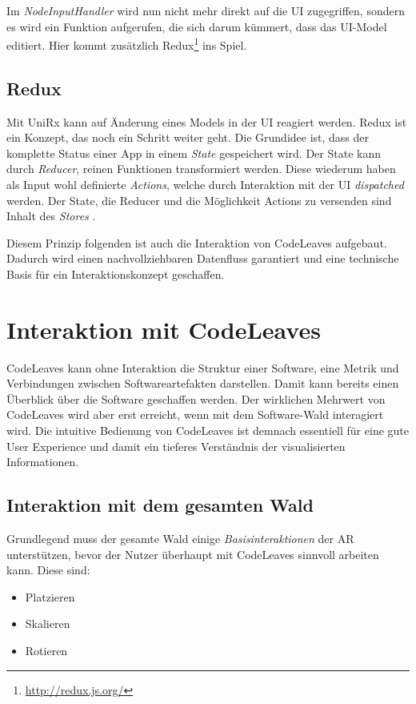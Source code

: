 Im \textit{NodeInputHandler} wird nun nicht mehr direkt auf die UI zugegriffen, sondern es wird ein Funktion aufgerufen, die sich darum kümmert, dass das UI-Model editiert. Hier kommt zusätzlich Redux\footnote{\url{http://redux.js.org/}} ins Spiel.

\subsection{Redux}
Mit UniRx kann auf Änderung eines Models in der UI reagiert werden. Redux ist ein Konzept, das noch ein Schritt weiter geht. Die Grundidee ist, dass der komplette Status einer App in einem \textit{State} gespeichert wird. Der State kann durch \textit{Reducer}, reinen Funktionen transformiert werden. Diese wiederum haben als Input wohl definierte \textit{Actions}, welche durch Interaktion mit der UI \textit{dispatched} werden. Der State, die Reducer und die Möglichkeit Actions zu versenden sind Inhalt des \textit{Stores} \cite{abramov2017redux}.

Diesem Prinzip folgenden ist auch die Interaktion von CodeLeaves aufgebaut. Dadurch wird einen nachvollziehbaren Datenfluss garantiert und eine technische Basis für ein Interaktionskonzept geschaffen.

\section{Interaktion mit CodeLeaves}
\label{sec:interaction}

CodeLeaves kann ohne Interaktion die Struktur einer Software, eine Metrik und Verbindungen zwischen Softwareartefakten darstellen. Damit kann bereits einen Überblick über die Software geschaffen werden. Der wirklichen Mehrwert von CodeLeaves wird aber erst erreicht, wenn mit dem Software-Wald interagiert wird. Die intuitive Bedienung von CodeLeaves ist demnach essentiell für eine gute User Experience und damit ein tieferes Verständnis der visualisierten Informationen.

\subsection{Interaktion mit dem gesamten Wald}
Grundlegend muss der gesamte Wald einige \textit{Basisinteraktionen} der AR unterstützen, bevor der Nutzer überhaupt mit CodeLeaves sinnvoll arbeiten kann. Diese sind:

\begin{itemize}
  \item Platzieren
  \item Skalieren
  \item Rotieren
\end{itemize}

